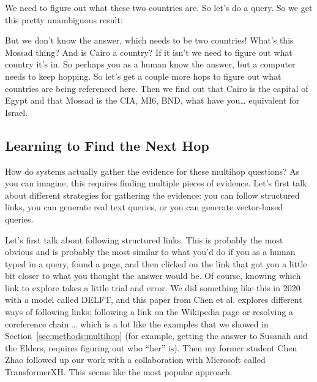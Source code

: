 
We need to figure out what these two countries are.  So let's do a query.  So we get this pretty unambiguous result:


But we don't know the answer, which needs to be two countries!  What's this Mossad thing?  And is Cairo a country?  If it isn't we need to figure out what country it's in.  So perhaps you as a human know the answer, but a computer needs to keep hopping.  So let's get a couple more hops to figure out what countries are being referenced here.  Then we find out that Cairo is the capital of Egypt and that Mossad is the CIA, MI6, BND, what have you\dots{} equivalent for Israel.


\subsection{Learning to Find the Next Hop}

How do systems actually gather the evidence for these multihop questions?  As you can imagine, this requires finding multiple pieces of evidence.  Let’s first talk about different strategies for gathering the evidence: you can follow structured links, you can generate real text queries, or you can generate vector-based queries.

Let’s first talk about following structured links.  This is probably the most obvious and is probably the most similar to what you’d do if you as a human typed in a query, found a page, and then clicked on the link that got you a little bit closer to what you thought the answer would be.  Of course, knowing which link to explore takes a little trial and error.  We did something like this in 2020 with a model called DELFT, and this paper from Chen et al. explores different ways of following links: following a link on the Wikipedia page or resolving a coreference chain … which is a lot like the examples that we showed in Section~\ref{sec:methods:multihop} (for example, getting the answer to Susanah and the Elders, requires figuring out who “her” is).  Then my former student Chen Zhao followed up our work with a collaboration with Microsoft called TransformerXH.  This seems like the most popular approach.

